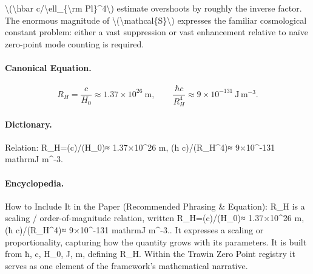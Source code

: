 \textbackslash{}(\textbackslash{}hbar c/\textbackslash{}ell\_\{\textbackslash{}rm Pl\}\textasciicircum{}4\textbackslash{}) estimate overshoots by roughly the inverse factor. The enormous magnitude of \textbackslash{}(\textbackslash{}mathcal\{S\}\textbackslash{}) expresses the familiar cosmological constant problem: either a vast suppression or vast enhancement relative to naïve zero-point mode counting is required.

\paragraph{Canonical Equation.}
\[
R_H=\frac{c}{H_0}\approx 1.37\times10^{26}\ \mathrm{m}, \qquad \frac{\hbar c}{R_H^4}\approx 9\times10^{-131}\ \mathrm{J\,m^{-3}}.
\]

\paragraph{Dictionary.}
Relation: R\_H=(c)/(H\_0)≈ 1.37×10\textasciicircum{}26 m, (ħ c)/(R\_H\textasciicircum{}4)≈ 9×10\textasciicircum{}-131 mathrmJ m\textasciicircum{}-3.

\paragraph{Encyclopedia.}
How to Include It in the Paper (Recommended Phrasing \& Equation): R\_H is a scaling / order-of-magnitude relation, written R\_H=(c)/(H\_0)≈ 1.37×10\textasciicircum{}26 m, (ħ c)/(R\_H\textasciicircum{}4)≈ 9×10\textasciicircum{}-131 mathrmJ m\textasciicircum{}-3.. It expresses a scaling or proportionality, capturing how the quantity grows with its parameters. It is built from ħ, c, H\_0, J, m, defining R\_H. Within the Trawin Zero Point registry it serves as one element of the framework's mathematical narrative.
